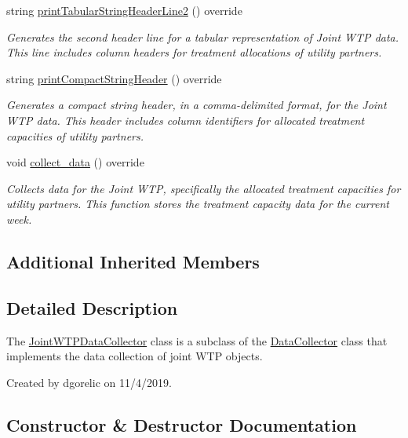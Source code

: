 \begin{DoxyCompactItemize}
string \mbox{\hyperlink{classJointWTPDataCollector_ab5828bc2dec423f812b5591ea42e9972}{print\+Tabular\+String\+Header\+Line2}} () override
\begin{DoxyCompactList}\small\item\em Generates the second header line for a tabular representation of Joint W\+TP data. This line includes column headers for treatment allocations of utility partners. \end{DoxyCompactList}\item 
string \mbox{\hyperlink{classJointWTPDataCollector_a42bacc8ab8cc78e38715966c8dbe8de9}{print\+Compact\+String\+Header}} () override
\begin{DoxyCompactList}\small\item\em Generates a compact string header, in a comma-\/delimited format, for the Joint W\+TP data. This header includes column identifiers for allocated treatment capacities of utility partners. \end{DoxyCompactList}\item 
void \mbox{\hyperlink{classJointWTPDataCollector_a64383431902c18f1d90a33fbcc211658}{collect\+\_\+data}} () override
\begin{DoxyCompactList}\small\item\em Collects data for the Joint W\+TP, specifically the allocated treatment capacities for utility partners. This function stores the treatment capacity data for the current week. \end{DoxyCompactList}\end{DoxyCompactItemize}
\subsection*{Additional Inherited Members}


\subsection{Detailed Description}
The {\ttfamily \mbox{\hyperlink{classJointWTPDataCollector}{Joint\+W\+T\+P\+Data\+Collector}}} class is a subclass of the {\ttfamily \mbox{\hyperlink{classDataCollector}{Data\+Collector}}} class that implements the data collection of joint W\+TP objects. 

Created by dgorelic on 11/4/2019. 

\subsection{Constructor \& Destructor Documentation}
\mbox{\label{classJointWTPDataCollector_adcff7bd94e8f81a848b073d3a17c29ee}} 
